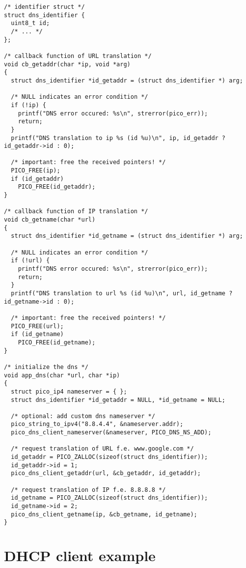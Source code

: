 \begin{verbatim}
/* identifier struct */
struct dns_identifier {
  uint8_t id;
  /* ... */
};

/* callback function of URL translation */
void cb_getaddr(char *ip, void *arg)
{
  struct dns_identifier *id_getaddr = (struct dns_identifier *) arg;
  
  /* NULL indicates an error condition */
  if (!ip) {
    printf("DNS error occured: %s\n", strerror(pico_err));
    return;
  }
  printf("DNS translation to ip %s (id %u)\n", ip, id_getaddr ? id_getaddr->id : 0);
  
  /* important: free the received pointers! */
  PICO_FREE(ip);
  if (id_getaddr)
    PICO_FREE(id_getaddr);
}

/* callback function of IP translation */
void cb_getname(char *url)
{
  struct dns_identifier *id_getname = (struct dns_identifier *) arg;
  
  /* NULL indicates an error condition */
  if (!url) {
    printf("DNS error occured: %s\n", strerror(pico_err));
    return;
  }
  printf("DNS translation to url %s (id %u)\n", url, id_getname ? id_getname->id : 0);
  
  /* important: free the received pointers! */
  PICO_FREE(url);
  if (id_getname)
    PICO_FREE(id_getname);
}

/* initialize the dns */
void app_dns(char *url, char *ip)
{
  struct pico_ip4 nameserver = { };
  struct dns_identifier *id_getaddr = NULL, *id_getname = NULL;
  
  /* optional: add custom dns nameserver */
  pico_string_to_ipv4("8.8.4.4", &nameserver.addr);
  pico_dns_client_nameserver(&nameserver, PICO_DNS_NS_ADD);

  /* request translation of URL f.e. www.google.com */  
  id_getaddr = PICO_ZALLOC(sizeof(struct dns_identifier));
  id_getaddr->id = 1;
  pico_dns_client_getaddr(url, &cb_getaddr, id_getaddr);

  /* request translation of IP f.e. 8.8.8.8 */
  id_getname = PICO_ZALLOC(sizeof(struct dns_identifier));
  id_getname->id = 2;
  pico_dns_client_getname(ip, &cb_getname, id_getname);
}
\end{verbatim}


\section{DHCP client example}

